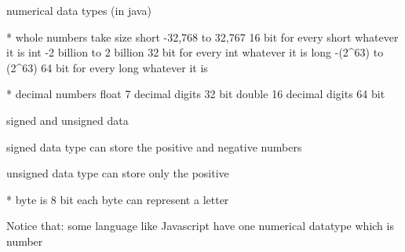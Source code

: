 numerical data types  (in java)

    * whole numbers                                 take size
      short       -32,768 to 32,767                  16 bit    for every short whatever it is 
      int         -2 billion to 2 billion            32 bit    for every int whatever it is 
      long        -(2^63)  to (2^63)                 64 bit    for every long whatever it is 

    * decimal numbers
      float      7 decimal digits                     32 bit 
      double     16 decimal digits                    64 bit 
    
    signed and unsigned data 

      signed data type 
        can store the positive and negative numbers 

      unsigned data type 
        can store only the positive 
    
    * byte is 8 bit 
      each byte can represent a letter 

Notice that:
 some language like Javascript have one numerical datatype which is number
